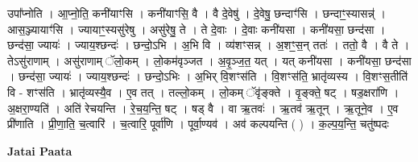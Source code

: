 \documentclass[17pt]{extarticle}
\begin{document}
उपा᳚प्नोति । आ॒प्नो॒ति॒ कनी॑याꣳसि । कनी॑याꣳसि॒ वै । वै दे॒वेषु॑ । दे॒वेषु॒ छन्दाꣳ॑सि । छन्दाꣳ॒॒स्यासन्न्॑ । आस॒ञ्ज्यायाꣳ॑सि । ज्यायाꣳ॒॒स्यसु॑रेषु । असु॑रेषु॒ ते । ते दे॒वाः । दे॒वाः कनी॑यसा । कनी॑यसा॒ छन्द॑सा । छन्द॑सा॒ ज्यायः॑ । ज्याय॒श्छन्दः॑ । छन्दो॒ऽभि । अ॒भि वि । व्य॑शꣳसन्न् । अ॒शꣳ॒॒स॒न् ततः॑ । ततो॒ वै । वै ते । तेऽसु॑राणाम् । असु॑राणाम् ॅलो॒कम् । लो॒कम॑वृञ्जत । अ॒वृ॒ञ्ज॒त॒ यत् । यत् कनी॑यसा । कनी॑यसा॒ छन्द॑सा । छन्द॑सा॒ ज्यायः॑ । ज्याय॒श्छन्दः॑ । छन्दो॒ऽभिः । अ॒भिर् वि॒शꣳस॑ति । वि॒शꣳस॑ति॒ भ्रातृ॑व्यस्य । वि॒शꣳस॒तीति॑ वि - शꣳस॑ति । भ्रातृ॑व्यस्यै॒व । ए॒व तत् । तल्लो॒कम् । लो॒कम् ॅवृ॑ङ्‍क्ते । वृ॒ङ्‍क्ते॒ षट् । षड॒क्षरा॑णि । अ॒क्षरा॒ण्यति॑ । अति॑ रेचयन्ति । रे॒च॒य॒न्ति॒ षट् । षड् वै । वा ऋ॒तवः॑ । ऋ॒तव॑ ऋ॒तून् । ऋ॒तूने॒व । ए॒व प्री॑णाति । प्री॒णा॒ति॒ च॒त्वारि॑ । च॒त्वारि॒ पूर्वा॑णि । पूर्वा॒ण्यव॑ । अव॑ कल्पयन्ति ( ) । क॒ल्प॒य॒न्ति॒ चतु॑ष्पदः \newline

\textbf{Jatai Paata} \newline
\end{document}
